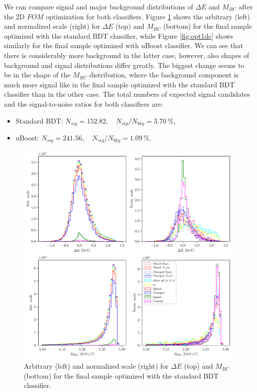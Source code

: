 \documentclass[oneside,a4paper,openany,12pt]{scrbook}
\begin{document}
We can compare signal and major background distributions of $\Delta E$ and $M_{BC}$ after the 2D $FOM$ optimization for both classifiers. Figure \ref{fig:opt01c} shows the arbitrary (left) and normalized scale (right) for $\Delta E$ (top) and $M_{BC}$ (bottom) for the final sample optimized with the standard BDT classifier, while Figure \ref{fig:opt1dc} shows similarly for the final sample optimized with uBoost classifier. We can see that there is considerably more background in the latter case, however, also shapes of background and signal distributions differ greatly. The biggest change seems to be in the shape of the $M_{BC}$ distribution, where the background component is much more signal like in the final sample optimized with the standard BDT classifier than in the other case. The total numbers of expected signal candidates and the signal-to-noise ratios for both classifiers are:
\begin{itemize}
\item Standard BDT: $N_{sig} = 152.82,\quad N_{sig}/N_{bkg} = 3.70~\%$,
\item uBoost: $N_{sig} = 241.56,\quad N_{sig}/N_{bkg} = 1.09~\%$.
\end{itemize}

\begin{figure}[H]
\centering
\captionsetup{width=0.8\linewidth}
\includegraphics[width=\linewidth]{fig/opt_01c}
\caption{Arbitrary (left) and normalized scale (right) for $\Delta E$ (top) and $M_{BC}$ (bottom) for the final sample optimized with the standard BDT classifier.}
\label{fig:opt01c}
\end{figure} 
\end{document}
